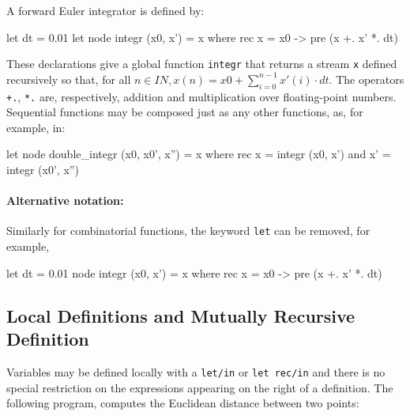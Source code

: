 \documentclass[11pt,titlepage,twoside]{report}
\newcommand{\zls}[1]{\texttt{#1}}
\newcommand{\Nat}{I\!\!N}
\begin{document}
\medskip\noindent
A forward Euler integrator is defined by:
\begin{runverbatim}[withresult,label=integr]
let dt = 0.01
let node integr (x0, x') = x where
  rec x = x0 -> pre (x +. x' *. dt)
\end{runverbatim}
These declarations give a global function \zls{integr} that returns a stream 
\zls{x} defined
recursively so that, for all $n \in \Nat, x(n) = x0 + \sum_{i=0}^{n-1}
x'(i)\cdot dt$.  The operators \verb-+.-, \verb-*.- are, respectively, 
addition and multiplication over floating-point numbers. Sequential
functions may be composed just as any other functions, as, for example, in:
\begin{runverbatim}[continue]
let node double_integr (x0, x0', x'') = x where
  rec x = integr (x0, x')
  and x' = integr (x0', x'')
\end{runverbatim}

\paragraph{Alternative notation:} Similarly for combinatorial functions,
the keyword \zls{let} can be removed, for example,

\begin{runverbatim}
let dt = 0.01
node integr (x0, x') = x where
  rec x = x0 -> pre (x +. x' *. dt)
\end{runverbatim}




\subsection{Local Definitions and Mutually Recursive Definition} %
\label{sec:local-defin-mutu}
Variables may be defined locally with a \verb-let/in- or
\verb-let rec/in- and there is no special restriction on the
expressions appearing on the right of a definition. The following
program, computes the Euclidean distance between two points:
\end{document}
